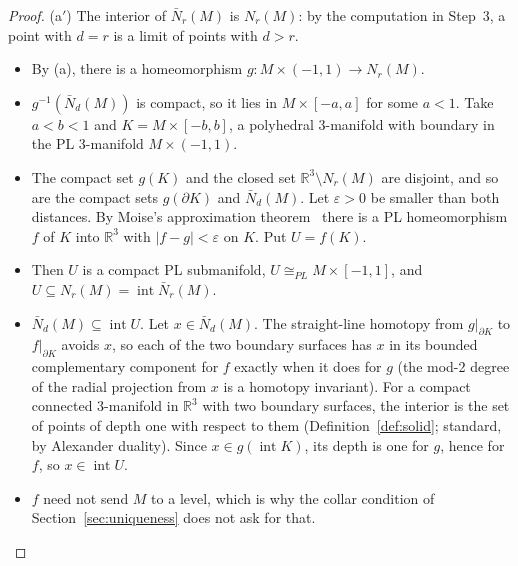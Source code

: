 \documentclass[preprint,12pt]{elsarticle}
\theoremstyle{definition}
\theoremstyle{remark}
\newcommand{\R}{\mathbb{R}}
\newcommand{\inter}{\operatorname{int}}
\begin{document}
\begin{proof}
(a$'$) The interior of $\bar N_r(M)$ is $N_r(M)$: by the computation in Step~3, a point with $d=r$ is a limit of
points with $d>r$.
\begin{itemize}
\item By (a), there is a homeomorphism $g\colon M\times(-1,1)\to N_r(M)$.
\item $g^{-1}(\bar N_d(M))$ is compact, so it lies in $M\times[-a,a]$ for some $a<1$. Take $a<b<1$ and
$K=M\times[-b,b]$, a polyhedral 3-manifold with boundary in the PL 3-manifold $M\times(-1,1)$.
\item The compact set $g(K)$ and the closed set $\R^3\setminus N_r(M)$ are disjoint, and so are the compact sets $g(\partial K)$ and $\bar N_d(M)$. Let
$\varepsilon>0$ be smaller than both distances. By Moise's approximation theorem~\cite[Thm.~35.2]{Moise77} there is a
PL homeomorphism $f$ of $K$ into $\R^3$ with $|f-g|<\varepsilon$ on $K$. Put $U=f(K)$.
\item Then $U$ is a compact PL submanifold, $U\cong_{PL}M\times[-1,1]$, and $U\subseteq N_r(M)=\inter\bar N_r(M)$.
\item $\bar N_d(M)\subseteq\inter U$. Let $x\in\bar N_d(M)$. The straight-line homotopy from $g|_{\partial K}$ to
$f|_{\partial K}$ avoids $x$, so each of the two boundary surfaces has $x$ in its bounded complementary component for $f$
exactly when it does for $g$ (the mod-2 degree of the radial projection from $x$ is a homotopy invariant). For a compact
connected 3-manifold in $\R^3$ with two boundary surfaces, the interior is the set of points of depth one with respect to
them (Definition~\ref{def:solid}; standard, by Alexander duality). Since $x\in g(\inter K)$, its depth is one for $g$,
hence for $f$, so $x\in\inter U$.
\item $f$ need not send $M$ to a level, which is why the collar condition of Section~\ref{sec:uniqueness} does not ask
for that.
\end{itemize}


\end{proof}
\end{document}
